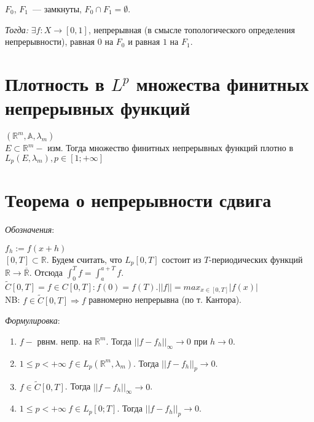 \documentclass[paper=a4, fontsize=14pt]{report}
\begin{document}
    $F_0$, $F_1$~--- замкнуты, $F_0 \cap F_1 = \emptyset$.

    \emph{Тогда:} $\exists f: X \rightarrow [0,1]$, непрерывная (в смысле топологического определения непрерывности), равная $0$ на $F_0$ и равная $1$ на $F_1$.

    \section{Плотность в $L^p$ множества финитных непрерывных функций}
    $(\mathbb{R}^m, \mathbb{A}, \lambda_m)$\\

    $E \subset \mathbb{R}^m -$ изм. Тогда множество финитных непрерывных функций плотно в $L_p(E, \lambda_m), p \in [1; +\infty]$\\

    \section{Теорема о непрерывности сдвига}
    \emph{Обозначения}:

    $f_h := f(x+h)$ \\
    $[0, T] \subset \mathbb{R}$. Будем считать, что $L_p[0, T]$ состоит из $T$-периодических функций $\mathbb{R} \rightarrow \overline {\mathbb{R}}$. Отсюда $\int_{0}^{T} f = \int_{a}^{a+T} f.$ \\
    $\widetilde{C}[0, T] = {f \in C[0, T]: f(0) = f(T) }. ||f|| = max_{x\in[0,T]}|f(x)|$ \\
    NB: $f \in \widetilde{C}[0, T] \Rightarrow f$ равномерно непрерывна (по т. Кантора).

    \emph{Формулировка}:
    \begin{enumerate}
        \item $f - $ рвнм. непр. на $\mathbb{R}^m$. Тогда $||f-f_h||_\infty \rightarrow 0$ при $h\rightarrow 0$.
        \item $1 \leq p < + \infty \ f \in L_p(\mathbb{R}^m, \lambda_m)$. Тогда $||f-f_h||_p \rightarrow 0$.
        \item $f \in \widetilde{C}[0, T]$. Тогда $||f-f_h||_\infty \rightarrow 0$.
        \item $1 \leq p < + \infty \  f \in L_p[0; T]$. Тогда $||f-f_h||_p \rightarrow 0$.
    \end{enumerate}
\end{document}
